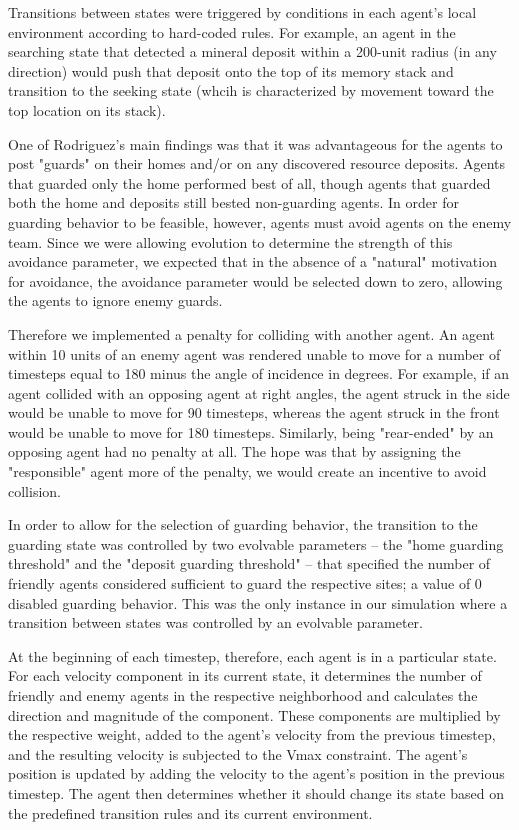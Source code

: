\documentclass[12pt,journal,compsoc]{IEEEtran}
\begin{document}
Transitions between states were triggered by conditions in each agent's local environment according to hard-coded rules. For example, an agent in the searching state that detected a mineral deposit within a 200-unit radius (in any direction) would push that deposit onto the top of its memory stack and transition to the seeking state (whcih is characterized by movement toward the top location on its stack).

One of Rodriguez's main findings was that it was advantageous for the agents to post "guards" on their homes and/or on any discovered resource deposits. Agents that guarded only the home performed best of all, though agents that guarded both the home and deposits still bested non-guarding agents. In order for guarding behavior to be feasible, however, agents must avoid agents on the enemy team. Since we were allowing evolution to determine the strength of this avoidance parameter, we expected that in the absence of a "natural" motivation for avoidance, the avoidance parameter would be selected down to zero, allowing the agents to ignore enemy guards.

Therefore we implemented a penalty for colliding with another agent. An agent within 10 units of an enemy agent was rendered unable to move for a number of timesteps equal to 180 minus the angle of incidence in degrees. For example, if an agent collided with an opposing agent at right angles, the agent struck in the side would be unable to move for 90 timesteps, whereas the agent struck in the front would be unable to move for 180 timesteps. Similarly, being "rear-ended" by an opposing agent had no penalty at all. The hope was that by assigning the "responsible" agent more of the penalty, we would create an incentive to avoid collision.

In order to allow for the selection of guarding behavior, the transition to the guarding state was controlled by two  evolvable parameters -- the "home guarding threshold" and the "deposit guarding threshold" -- that specified the number of friendly agents considered sufficient to guard the respective sites; a value of 0 disabled guarding behavior. This was the only instance in our simulation where a transition between states was controlled by an evolvable parameter.

At the beginning of each timestep, therefore, each agent is in a particular state. For each velocity component in its current state, it determines the number of friendly and enemy agents in the respective neighborhood and calculates the direction and magnitude of the component. These components are multiplied by the respective weight, added to the agent's velocity from the previous timestep, and the resulting velocity is subjected to the Vmax constraint. The agent's position is updated by adding the velocity to the agent's position in the previous timestep. The agent then determines whether it should change its state based on the predefined transition rules and its current environment.
\end{document}
